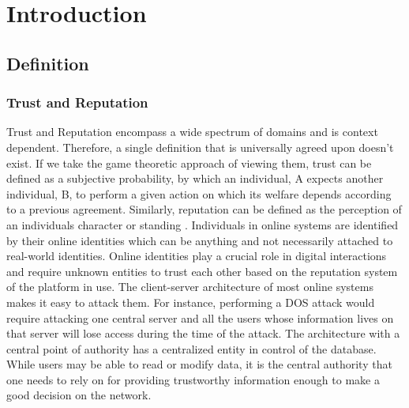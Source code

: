 \chapter{Introduction} \label{ch:intro}

\section{Definition}
\subsection{Trust and Reputation}
Trust and Reputation encompass a wide spectrum of domains and is
context dependent. Therefore, a single definition that is universally
agreed upon doesn't exist. If we take the game theoretic approach of
viewing them, trust can be defined as a subjective probability, by
which an individual, A expects another individual, B, to perform
a given action on which its welfare depends according to a previous 
agreement.
Similarly, reputation can be 
defined as the perception of an individuals character or standing
\cite{Sabater2005}. Individuals in online systems are identified by
their online identities which can be anything and not necessarily
attached to real-world identities. Online identities play a crucial
role in digital interactions and require unknown entities to trust each
other based on the reputation system of the platform in use. The 
client-server architecture of most online systems makes it easy to 
attack them. For instance, performing a DOS attack would require
attacking one central server and all the users whose information lives
on that server will lose access during the time of the attack. The 
architecture with a central point of authority has a centralized entity
in control of the database. While users may be able to read or modify
data, it is the central authority that one needs to rely on for
providing trustworthy information enough to make a good decision on the
network.  


